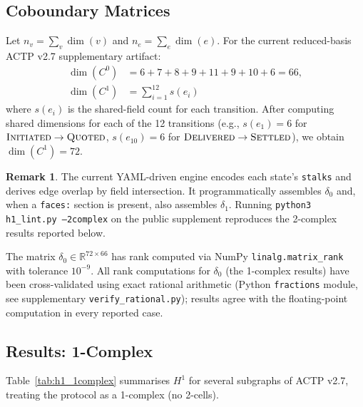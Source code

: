 \documentclass[11pt]{article}
\theoremstyle{plain}
\theoremstyle{definition}
\newtheorem{remark}[theorem]{Remark}
\newcommand{\Czero}{C^{0}}
\newcommand{\Cone}{C^{1}}
\newcommand{\Hone}{H^{1}}
\newcommand{\deltazero}{\delta_{0}}
\newcommand{\deltaone}{\delta_{1}}
\newcommand{\RR}{\mathbb{R}}
\newcommand{\dimn}{\operatorname{dim}}
\newcommand{\sINIT}{\textsc{Initiated}}
\newcommand{\sQUOT}{\textsc{Quoted}}
\newcommand{\sDELIV}{\textsc{Delivered}}
\newcommand{\sSETTL}{\textsc{Settled}}
\begin{document}
\subsection{Coboundary Matrices}
\label{sec:matrices}

Let $n_v = \sum_{v} \dimn(v)$ and $n_e = \sum_{e} \dimn(e)$.  For the
current reduced-basis ACTP v2.7 supplementary artifact:
\begin{align*}
  \dimn(\Czero) &= 6 + 7 + 8 + 9 + 11 + 9 + 10 + 6 = 66, \\
  \dimn(\Cone)  &= \sum_{i=1}^{12} s(e_i)
\end{align*}
where $s(e_i)$ is the shared-field count for each transition.  After
computing shared dimensions for each of the 12 transitions (e.g.,
$s(e_1) = 6$ for $\sINIT \to \sQUOT$, $s(e_{10}) = 6$ for $\sDELIV \to
\sSETTL$), we obtain $\dimn(\Cone) = 72$.

\begin{remark}
The current YAML-driven engine encodes each state's \texttt{stalks} and
derives edge overlap by field intersection.  It programmatically assembles
$\deltazero$ and, when a \texttt{faces:} section is present, also assembles
$\deltaone$.  Running \texttt{python3 h1\_lint.py --2complex} on the public
supplement reproduces the 2-complex results reported below.
\end{remark}

The matrix $\deltazero \in \RR^{72 \times 66}$ has rank computed via
NumPy \texttt{linalg.matrix\_rank} with tolerance $10^{-9}$.  All rank
computations for $\deltazero$ (the 1-complex results) have been
cross-validated using exact rational arithmetic (Python
\texttt{fractions} module, see supplementary \texttt{verify\_rational.py});
results agree with the floating-point computation in every reported case.

\subsection{Results: 1-Complex}
\label{sec:results_1complex}

Table~\ref{tab:h1_1complex} summarises $\Hone$ for several subgraphs of
ACTP v2.7, treating the protocol as a 1-complex (no 2-cells).
\end{document}
